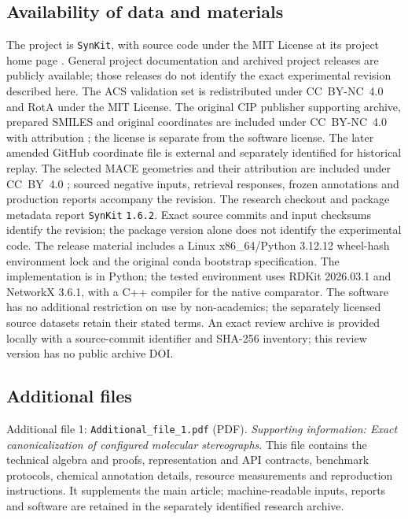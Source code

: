 \documentclass[pdflatex,sn-mathphys-num,referee,lineno]{sn-jnl}
\newcommand{\synkit}{\texttt{SynKit}\xspace}
\newcommand{\code}[1]{\texttt{#1}}
\theoremstyle{plain}
\theoremstyle{remark}
\theoremstyle{definition}
\begin{document}
\subsection*{Availability of data and materials}
The project is \synkit, with source code under the MIT License at its
project home page \cite{synkitSource}. General project documentation
\cite{synkitDocumentation} and archived project releases
\cite{synkitProjectArchive} are publicly available; those releases do not
identify the exact experimental revision described here. The ACS validation set is
redistributed under CC~BY-NC~4.0 and RotA under the MIT License. The original
CIP publisher supporting archive, prepared SMILES and original coordinates
are included under CC~BY-NC~4.0 with attribution \cite{hanson2018cip};
the license is separate from the software license. The later amended GitHub
coordinate file is external and separately identified for historical replay.
The selected MACE geometries and their attribution are
included under CC~BY~4.0 \cite{pidko2024macedata}; sourced negative inputs,
retrieval responses, frozen annotations and production reports accompany the
revision. The research checkout and package metadata report \synkit
\code{1.6.2}. Exact source commits and input checksums identify the revision;
the package version alone does not identify the experimental code. The release
material includes a Linux x86\_64/Python 3.12.12 wheel-hash environment lock
and the original conda bootstrap specification. The implementation is in
Python; the tested environment uses RDKit 2026.03.1 and NetworkX 3.6.1,
with a C++ compiler for the native comparator. The software has no additional
restriction on use by non-academics; the separately licensed source datasets
retain their stated terms. An exact review archive is provided locally with
a source-commit identifier and SHA-256 inventory; this review version has no
public archive DOI.

\subsection*{Additional files}
Additional file 1: \code{Additional\_file\_1.pdf} (PDF).
\emph{Supporting information: Exact canonicalization of configured molecular
stereographs}. This file contains the technical algebra and proofs,
representation and API contracts, benchmark protocols, chemical annotation
details, resource measurements and reproduction instructions. It supplements
the main article; machine-readable inputs, reports and software are retained
in the separately identified research archive.
\end{document}
